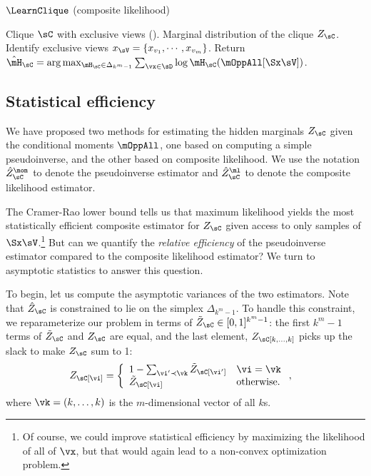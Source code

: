 \begin{algorithm}
  \caption{$\LearnClique$ (composite likelihood)}
  \label{algo:piecewise}
  \begin{algorithmic}
    \REQUIRE Clique $\sC$ with exclusive views ().
    \ENSURE Marginal distribution of the clique $Z_\sC$.
\STATE Identify exclusive views $x_\sV = \{x_{v_1}, \cdots, x_{v_m}\}$.
\STATE Return $\hat \mH_\sC = \arg\max_{\mH_\sC \in \Delta_{k^m-1}} \sum_{\vx \in \sD} \log \mH_\sC(\mOppAll[\Sx \sV])$.
  \end{algorithmic}
\end{algorithm}

\subsection{Statistical efficiency}

We have proposed two methods for estimating the hidden marginals $Z_\sC$ given
the conditional moments $\mOppAll$, one based on computing a simple pseudoinverse,
and the other based on composite likelihood.
We use the notation $\hat Z^\mom_\sC$ to denote the pseudoinverse
  estimator and $\hat Z^\ml_\sC$ to denote the composite likelihood
  estimator.

The Cramer-Rao lower bound tells us that maximum likelihood yields
the most statistically efficient composite estimator for $Z_\sC$
given access to only samples of $\Sx\sV$.\footnote{Of course, we could improve statistical efficiency
by maximizing the likelihood of all of $\vx$, but that would again lead to a non-convex optimization problem.}
But can we quantify the \emph{relative efficiency} of the pseudoinverse estimator
compared to the composite likelihood estimator?
We turn to asymptotic statistics to answer this question. 

To begin, let us compute the asymptotic variances of the two estimators. 
Note that $\hat Z_\sC$ is constrained to lie on the simplex
  $\Delta_{k^m-1}$. 
To handle this constraint, we reparameterize our problem in
  terms of $\tilde Z_\sC \in [0,1]^{k^m-1}$: the first $k^m -1$ terms of
  $\tilde Z_\sC$ and $Z_\sC$ are equal, and the last element, $Z_\sC[k,
  \ldots, k]$ picks up the slack to make $Z_\sC$ sum to 1:
\begin{align*}
  Z_\sC[\vi] &= \left\{
    \begin{array}{ll}
      1 - \sum_{\vi' \prec \vk} \tilde Z_\sC[\vi'] & \vi = \vk \\
      \tilde Z_\sC[\vi] & \text{otherwise.}
      \end{array}
      \right.,
\end{align*} 
where $\vk = (k, \ldots, k)$ is the $m$-dimensional vector of all $k$s. 


